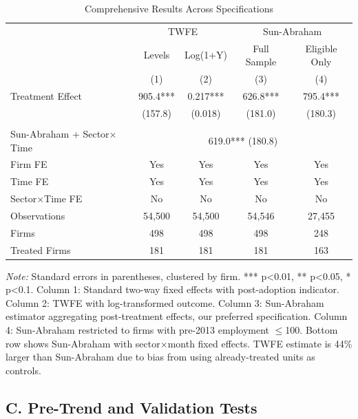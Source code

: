 \documentclass{article}
\begin{document}
\begin{table}[H]
\centering
\caption{Comprehensive Results Across Specifications}
\label{tab:results_main}
\begin{tabular}{lcccc}
\toprule
& \multicolumn{2}{c}{TWFE} & \multicolumn{2}{c}{Sun-Abraham} \\
\cmidrule(lr){2-3} \cmidrule(lr){4-5}
& Levels & Log(1+Y) & Full Sample & Eligible Only \\
& (1) & (2) & (3) & (4) \\
\midrule
Treatment Effect & 905.4*** & 0.217*** & 626.8*** & 795.4*** \\
& (157.8) & (0.018) & (181.0) & (180.3) \\
\addlinespace[0.5em]
\multicolumn{5}{l}{\textit{Additional Specifications:}} \\
Sun-Abraham + Sector$\times$Time & \multicolumn{4}{c}{619.0*** (180.8)} \\
\addlinespace[0.5em]
Firm FE & Yes & Yes & Yes & Yes \\
Time FE & Yes & Yes & Yes & Yes \\
Sector$\times$Time FE & No & No & No & No \\
\addlinespace[0.3em]
Observations & 54,500 & 54,500 & 54,546 & 27,455 \\
Firms & 498 & 498 & 498 & 248 \\
Treated Firms & 181 & 181 & 181 & 163 \\
\bottomrule
\end{tabular}
\begin{tablenotes}[flushleft]
\small
\item \textit{Note:} Standard errors in parentheses, clustered by firm. *** p<0.01, ** p<0.05, * p<0.1. Column 1: Standard two-way fixed effects with post-adoption indicator. Column 2: TWFE with log-transformed outcome. Column 3: Sun-Abraham estimator aggregating post-treatment effects, our preferred specification. Column 4: Sun-Abraham restricted to firms with pre-2013 employment $\leq$100. Bottom row shows Sun-Abraham with sector$\times$month fixed effects. TWFE estimate is 44\% larger than Sun-Abraham due to bias from using already-treated units as controls.
\end{tablenotes}
\end{table}

\clearpage

\subsection*{C. Pre-Trend and Validation Tests}
\end{document}
